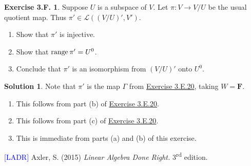\documentclass[12pt]{article}
\theoremstyle{definition}
\theoremstyle{exercise}
\newtheorem{exercise}{Exercise 3.F.}
\theoremstyle{solution}
\newtheorem*{solution}{Solution}
\newcommand{\lmap}{\mathcal{L}}
\newcommand{\ts}{\textsuperscript}
\newcommand{\Range}{\text{range\,}}
\newcommand{\F}{\mathbf{F}}
\begin{document}
\begin{exercise}
\label{ex:37}
    Suppose \( U \) is a subspace of \( V \). Let \( \pi : V \to V/U \) be the usual quotient map. Thus \( \pi' \in \lmap((V/U)', V') \).
    \begin{enumerate}
        \item Show that \( \pi' \) is injective.

        \item Show that \( \Range \pi' = U^0 \).

        \item Conclude that \( \pi' \) is an isomorphism from \( (V/U)' \) onto \( U^0 \).
    \end{enumerate}

\end{exercise}

\begin{solution}
    Note that \( \pi' \) is the map \( \Gamma \) from \href{https://lew98.github.io/Mathematics/LADR_Section_3_E_Exercises.pdf}{Exercise 3.E.20}, taking \( W = \F \).
    \begin{enumerate}
        \item This follows from part (b) of \href{https://lew98.github.io/Mathematics/LADR_Section_3_E_Exercises.pdf}{Exercise 3.E.20}.

        \item This follows from part (c) of \href{https://lew98.github.io/Mathematics/LADR_Section_3_E_Exercises.pdf}{Exercise 3.E.20}.

        \item This is immediate from parts (a) and (b) of this exercise.
    \end{enumerate}
\end{solution}

\noindent \hrulefill

\noindent \hypertarget{ladr}{\textcolor{blue}{[LADR]} Axler, S. (2015) \textit{Linear Algebra Done Right.} 3\ts{rd} edition.}
\end{document}
